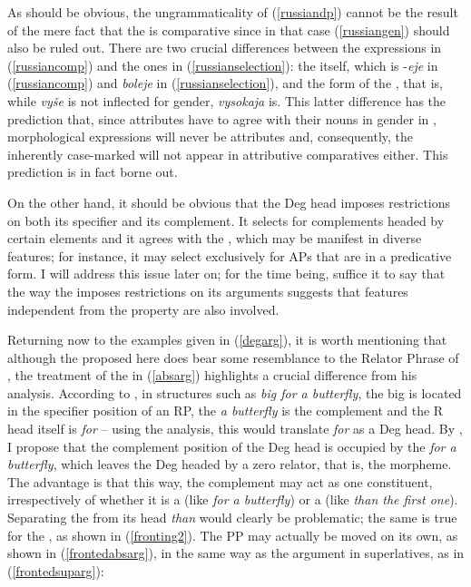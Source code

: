 As should be obvious, the ungrammaticality of (\ref{russiandp}) cannot be the result of the mere fact that the  is comparative since in that case (\ref{russiangen}) should also be ruled out. There are two crucial differences between the  expressions in (\ref{russiancomp}) and the ones in (\ref{russianselection}): the  itself, which is -\textit{eje} in (\ref{russiancomp}) and \textit{boleje} in (\ref{russianselection}), and the form of the , that is, while \textit{vyše} is not inflected for gender, \textit{vysokaja} is. This latter difference has the prediction that, since attributes have to agree with their nouns in gender in , morphological  expressions will never be attributes and, consequently, the inherently case-marked   will not appear in attributive comparatives either. This prediction is in fact borne out.

On the other hand, it should be obvious that the Deg head imposes restrictions on both its specifier and its complement. It selects for complements headed by certain elements and it agrees with the , which may be manifest in diverse features; for instance, it may select exclusively for APs that are in a predicative form. I will address this issue later on; for the time being, suffice it to say that the way the  imposes restrictions on its arguments suggests that features independent from the  property are also involved.

\largerpage[1]
Returning now to the examples given in (\ref{degarg}), it is worth mentioning that although the  proposed here does bear some resemblance to the Relator Phrase of \citet{dendikken2006}, the treatment of the  in (\ref{absarg}) highlights a crucial difference from his analysis. According to \citet[63]{dendikken2006}, in structures such as \textit{big for a butterfly}, the  big is located in the specifier position of an RP, the  \textit{a butterfly} is the complement and the R head itself is \textit{for} -- using the  analysis, this would translate \textit{for} as a Deg head. By , I propose that the complement position of the Deg head is occupied by the  \textit{for a butterfly}, which leaves the Deg headed by a zero relator, that is, the  morpheme. The advantage is that this way, the complement may act as one constituent, irrespectively of whether it is a  (like \textit{for a butterfly}) or a  (like \textit{than the first one}). Separating the  from its  head \textit{than} would clearly be problematic; the same is true for the , as shown in (\ref{fronting2}). The PP may actually be moved on its own, as shown in (\ref{frontedabsarg}), in the same way as the  argument in superlatives, as in (\ref{frontedsuparg}):

